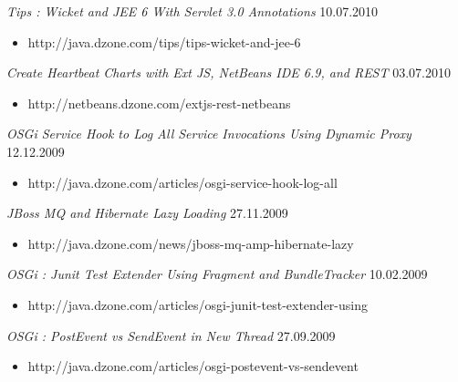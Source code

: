 \documentclass{res}
\begin{document}
\begin{resume}
{{\sl Tips : Wicket and JEE 6 With Servlet 3.0 Annotations}  \hfill  10.07.2010	\\
\vspace{-5mm}  \begin{itemize}
\item[]  \scriptsize http://java.dzone.com/tips/tips-wicket-and-jee-6
\end{itemize}
\vspace{-2mm}

{\sl Create Heartbeat Charts with Ext JS, NetBeans IDE 6.9, and REST}  \hfill    03.07.2010	\\
\vspace{-5mm}  \begin{itemize}
\item[]  \scriptsize http://netbeans.dzone.com/extjs-rest-netbeans
\end{itemize}
\vspace{-2mm}

{\sl OSGi Service Hook to Log All Service Invocations Using Dynamic Proxy}  \hfill    12.12.2009	\\
\vspace{-5mm}  \begin{itemize}
\item[]  \scriptsize http://java.dzone.com/articles/osgi-service-hook-log-all
\end{itemize}
\vspace{-2mm}

{\sl JBoss MQ and Hibernate Lazy Loading}  \hfill    27.11.2009	\\
\vspace{-5mm}  \begin{itemize}
\item[]  \scriptsize http://java.dzone.com/news/jboss-mq-amp-hibernate-lazy
\end{itemize}
\vspace{-2mm}

{\sl OSGi : Junit Test Extender Using Fragment and BundleTracker}  \hfill  10.02.2009	\\
\vspace{-5mm}  \begin{itemize}
\item[]  \scriptsize http://java.dzone.com/articles/osgi-junit-test-extender-using
\end{itemize}
\vspace{-2mm}

{\sl OSGi : PostEvent vs SendEvent in New Thread}  \hfill   27.09.2009	\\
\vspace{-5mm}  \begin{itemize}
\item[]  \scriptsize http://java.dzone.com/articles/osgi-postevent-vs-sendevent
\end{itemize}
\vspace{-2mm}

}
\end{resume}
\end{document}
